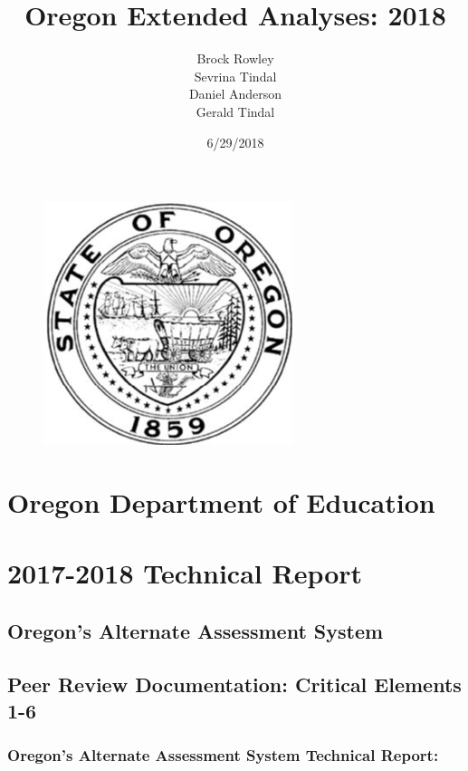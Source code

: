 \documentclass[]{article}
\title{Oregon Extended Analyses: 2018}
\author{Brock Rowley \\ Sevrina Tindal \\ Daniel Anderson \\ Gerald Tindal}
\date{6/29/2018}
\begin{document}
\maketitle

{
\setcounter{tocdepth}{4}
\tableofcontents
}
\newpage

 \setcounter{page}{5}

\begin{figure}
\centering
\includegraphics{img/stateofOR.png}
\caption{}
\end{figure}

\section{Oregon Department of
Education}\label{oregon-department-of-education}

\section{2017-2018 Technical Report}\label{technical-report}

\subsection{Oregon's Alternate Assessment
System}\label{oregons-alternate-assessment-system}

\subsection{Peer Review Documentation: Critical Elements
1-6}\label{peer-review-documentation-critical-elements-1-6}

\subsubsection{Oregon's Alternate Assessment System Technical
Report:}\label{oregons-alternate-assessment-system-technical-report}
\end{document}
